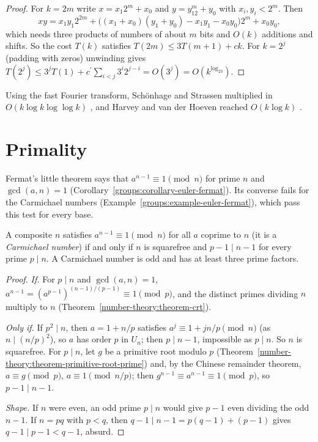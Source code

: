 \begin{proof}
For $k = 2m$ write $x = x_1 2^m + x_0$ and $y = y_12^m + y_0$ with $x_i, y_i < 2^m$. Then
\[
xy = x_1y_1 2^{2m} + \bigl((x_1 + x_0)(y_1 + y_0) - x_1y_1 - x_0y_0\bigr)2^m + x_0y_0,
\]
which needs three products of numbers of about $m$ bits and $O(k)$ additions and shifts. So the cost $T(k)$ satisfies $T(2m) \leq 3T(m + 1) + ck$. For $k = 2^j$ (padding with zeros) unwinding gives
$T(2^j) \leq 3^jT(1) + c^{\prime}\sum_{i<j}3^i2^{j-i} = O(3^j) = O(k^{\log_23})$.
\end{proof}

Using the fast Fourier transform, Schönhage and Strassen multiplied in $O(k\log k\log\log k)$ \cite{crandall-pomerance}, and Harvey and van der Hoeven reached $O(k\log k)$
\cite{harvey-van-der-hoeven-2021}.

\section{Primality}\label{cryptography:section-primality}

Fermat's little theorem says that $a^{n-1} \equiv 1 \pmod n$ for prime $n$ and $\gcd(a, n) = 1$ (Corollary~\ref{groups:corollary-euler-fermat}). Its converse fails for the Carmichael numbers
(Example~\ref{groups:example-euler-fermat}), which pass this test for every base.

\begin{proposition}[Korselt]\label{cryptography:proposition-korselt}
A composite $n$ satisfies $a^{n-1} \equiv 1 \pmod n$ for all $a$ coprime to $n$ (it is a \emph{Carmichael number}) if and only if $n$ is squarefree and $p - 1 \mid n - 1$ for every prime $p \mid n$. A Carmichael number
is odd and has at least three prime factors.
\end{proposition}

\begin{proof}
\emph{If.} For $p \mid n$ and $\gcd(a, n) = 1$, $a^{n-1} = (a^{p-1})^{(n-1)/(p-1)} \equiv 1 \pmod p$, and the distinct primes dividing $n$ multiply to $n$ (Theorem~\ref{number-theory:theorem-crt}).

\emph{Only if.} If $p^2 \mid n$, then $a = 1 + n/p$ satisfies $a^j \equiv 1 + jn/p \pmod n$ (as $n \mid (n/p)^2$), so $a$ has order $p$ in $U_n$; then $p \mid n - 1$, impossible as $p \mid n$. So $n$ is squarefree. For
$p \mid n$, let $g$ be a primitive root modulo $p$ (Theorem~\ref{number-theory:theorem-primitive-root-prime}) and, by the Chinese remainder theorem, $a \equiv g \pmod p$, $a \equiv 1 \pmod{n/p}$; then
$g^{n-1} \equiv a^{n-1} \equiv 1 \pmod p$, so $p - 1 \mid n - 1$.

\emph{Shape.} If $n$ were even, an odd prime $p \mid n$ would give $p - 1$ even dividing the odd $n - 1$. If $n = pq$ with $p < q$, then $q - 1 \mid n - 1 = p(q - 1) + (p - 1)$ gives $q - 1 \mid p - 1 < q - 1$, absurd.
\end{proof}

